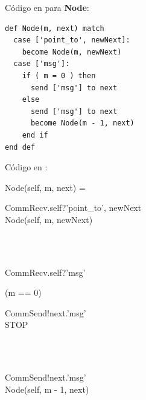 Código en \SAL para \textbf{Node}:

\begin{lstlisting}[language=sal, style=simple]
def Node(m, next) match
  case ['point_to', newNext]:
    become Node(m, newNext)
  case ['msg']:
    if ( m = 0 ) then
      send ['msg'] to next
    else
      send ['msg'] to next
      become Node(m - 1, next)
    end if
end def
\end{lstlisting}

Código en \CSP:

\begin{process}
Node(self, m, next) = \\ \quad
  \begin{block}
  CommRecv.self?\langle 'point\_to', newNext \rangle \then \\
  Node(self, m, newNext)
  \end{block} \\

  \Extchoice \\ \quad
  
  \begin{block}
  CommRecv.self?\langle 'msg' \rangle \then {} \\ \quad
    \begin{block}
    \If (m == 0) \Then {} \\ \quad
      \begin{block} 
      CommSend!next.\langle 'msg' \rangle \then \\
      STOP
      \end{block} \\
    \Else {} \\ \quad
      \begin{block}
      CommSend!next.\langle 'msg' \rangle \then \\
      Node(self, m - 1, next) 
      \end{block}
    \end{block}
  \end{block} 
\end{process}

% 


